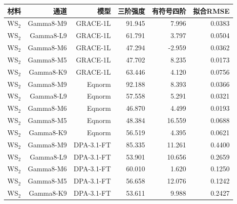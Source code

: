 \begin{tabular}{lrrrrr}
\toprule
材料 & 通道 & 模型 & 三阶强度 & 有符号四阶 & 拟合RMSE \\
\midrule
WS$_2$ & Gamma8-M9 & GRACE-1L & 91.945 & 7.996 & 0.0383 \\
WS$_2$ & Gamma8-L9 & GRACE-1L & 61.791 & 3.797 & 0.0504 \\
WS$_2$ & Gamma8-M6 & GRACE-1L & 47.294 & -2.959 & 0.0362 \\
WS$_2$ & Gamma8-M5 & GRACE-1L & 47.702 & 8.235 & 0.0173 \\
WS$_2$ & Gamma8-K9 & GRACE-1L & 63.446 & 4.120 & 0.0756 \\
WS$_2$ & Gamma8-M9 & Eqnorm & 92.188 & 8.393 & 0.0366 \\
WS$_2$ & Gamma8-L9 & Eqnorm & 57.558 & 5.291 & 0.0321 \\
WS$_2$ & Gamma8-M6 & Eqnorm & 46.870 & 4.499 & 0.0193 \\
WS$_2$ & Gamma8-M5 & Eqnorm & 48.384 & 16.559 & 0.0688 \\
WS$_2$ & Gamma8-K9 & Eqnorm & 56.519 & 4.395 & 0.0621 \\
WS$_2$ & Gamma8-M9 & DPA-3.1-FT & 85.335 & 11.261 & 0.4400 \\
WS$_2$ & Gamma8-L9 & DPA-3.1-FT & 53.901 & 10.656 & 0.2659 \\
WS$_2$ & Gamma8-M6 & DPA-3.1-FT & 60.010 & 1.620 & 0.1250 \\
WS$_2$ & Gamma8-M5 & DPA-3.1-FT & 56.658 & 12.076 & 0.1242 \\
WS$_2$ & Gamma8-K9 & DPA-3.1-FT & 53.611 & 9.988 & 0.2427 \\
\bottomrule
\end{tabular}
